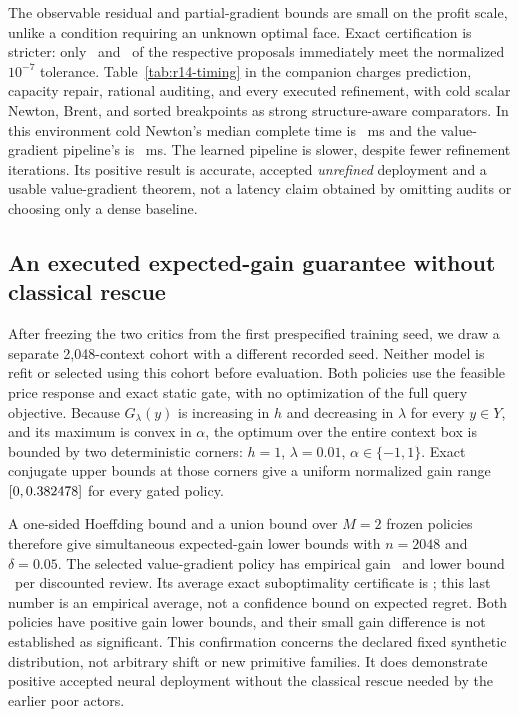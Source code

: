 The observable residual and partial-gradient bounds are small on the profit scale, unlike a condition requiring an unknown optimal face. Exact certification is stricter: only \RFourteenImmediateValue\ and \RFourteenImmediateGradient\ of the respective proposals immediately meet the normalized $10^{-7}$ tolerance. Table~\ref{tab:r14-timing} in the companion charges prediction, capacity repair, rational auditing, and every executed refinement, with cold scalar Newton, Brent, and sorted breakpoints as strong structure-aware comparators. In this environment cold Newton's median complete time is \RFourteenColdTime\ ms and the value-gradient pipeline's is \RFourteenLearnedTime\ ms. The learned pipeline is slower, despite fewer refinement iterations. Its positive result is accurate, accepted \emph{unrefined} deployment and a usable value-gradient theorem, not a latency claim obtained by omitting audits or choosing only a dense baseline.

\subsection{An executed expected-gain guarantee without classical rescue}
After freezing the two critics from the first prespecified training seed, we draw a separate 2,048-context cohort with a different recorded seed. Neither model is refit or selected using this cohort before evaluation. Both policies use the feasible price response and exact static gate, with no optimization of the full query objective. Because $G_\lambda(y)$ is increasing in $h$ and decreasing in $\lambda$ for every $y\in Y$, and its maximum is convex in $\alpha$, the optimum over the entire context box is bounded by two deterministic corners: $h=1$, $\lambda=0.01$, $\alpha\in\{-1,1\}$. Exact conjugate upper bounds at those corners give a uniform normalized gain range $[0,0.382478]$ for every gated policy.

A one-sided Hoeffding bound and a union bound over $M=2$ frozen policies therefore give simultaneous expected-gain lower bounds with $n=2048$ and $\delta=0.05$. The selected value-gradient policy has empirical gain \RFourteenValidationGain\ and lower bound \RFourteenValidationFloor\ per discounted review. Its average exact suboptimality certificate is \RFourteenValidationGap; this last number is an empirical average, not a confidence bound on expected regret. Both policies have positive gain lower bounds, and their small gain difference is not established as significant. This confirmation concerns the declared fixed synthetic distribution, not arbitrary shift or new primitive families. It does demonstrate positive accepted neural deployment without the classical rescue needed by the earlier poor actors.

